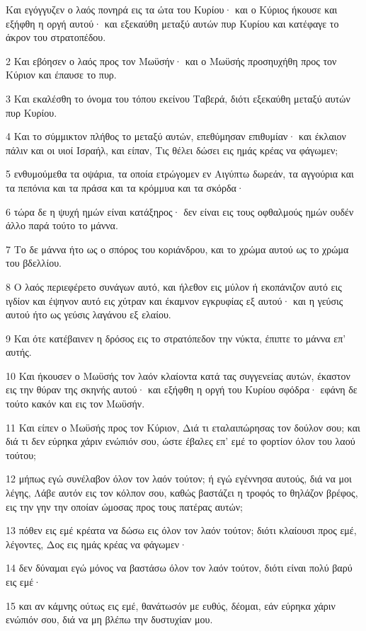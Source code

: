 \par Και εγόγγυζεν ο λαός πονηρά εις τα ώτα του Κυρίου· και ο Κύριος ήκουσε και εξήφθη η οργή αυτού· και εξεκαύθη μεταξύ αυτών πυρ Κυρίου και κατέφαγε το άκρον του στρατοπέδου.
\par 2 Και εβόησεν ο λαός προς τον Μωϋσήν· και ο Μωϋσής προσηυχήθη προς τον Κύριον και έπαυσε το πυρ.
\par 3 Και εκαλέσθη το όνομα του τόπου εκείνου Ταβερά, διότι εξεκαύθη μεταξύ αυτών πυρ Κυρίου.
\par 4 Και το σύμμικτον πλήθος το μεταξύ αυτών, επεθύμησαν επιθυμίαν· και έκλαιον πάλιν και οι υιοί Ισραήλ, και είπαν, Τις θέλει δώσει εις ημάς κρέας να φάγωμεν;
\par 5 ενθυμούμεθα τα οψάρια, τα οποία ετρώγομεν εν Αιγύπτω δωρεάν, τα αγγούρια και τα πεπόνια και τα πράσα και τα κρόμμυα και τα σκόρδα·
\par 6 τώρα δε η ψυχή ημών είναι κατάξηρος· δεν είναι εις τους οφθαλμούς ημών ουδέν άλλο παρά τούτο το μάννα.
\par 7 Το δε μάννα ήτο ως ο σπόρος του κοριάνδρου, και το χρώμα αυτού ως το χρώμα του βδελλίου.
\par 8 Ο λαός περιεφέρετο συνάγων αυτό, και ήλεθον εις μύλον ή εκοπάνιζον αυτό εις ιγδίον και έψηνον αυτό εις χύτραν και έκαμνον εγκρυφίας εξ αυτού· και η γεύσις αυτού ήτο ως γεύσις λαγάνου εξ ελαίου.
\par 9 Και ότε κατέβαινεν η δρόσος εις το στρατόπεδον την νύκτα, έπιπτε το μάννα επ' αυτής.
\par 10 Και ήκουσεν ο Μωϋσής τον λαόν κλαίοντα κατά τας συγγενείας αυτών, έκαστον εις την θύραν της σκηνής αυτού· και εξήφθη η οργή του Κυρίου σφόδρα· εφάνη δε τούτο κακόν και εις τον Μωϋσήν.
\par 11 Και είπεν ο Μωϋσής προς τον Κύριον, Διά τι εταλαιπώρησας τον δούλον σου; και διά τι δεν εύρηκα χάριν ενώπιόν σου, ώστε έβαλες επ' εμέ το φορτίον όλον του λαού τούτου;
\par 12 μήπως εγώ συνέλαβον όλον τον λαόν τούτον; ή εγώ εγέννησα αυτούς, διά να μοι λέγης, Λάβε αυτόν εις τον κόλπον σου, καθώς βαστάζει η τροφός το θηλάζον βρέφος, εις την γην την οποίαν ώμοσας προς τους πατέρας αυτών;
\par 13 πόθεν εις εμέ κρέατα να δώσω εις όλον τον λαόν τούτον; διότι κλαίουσι προς εμέ, λέγοντες, Δος εις ημάς κρέας να φάγωμεν·
\par 14 δεν δύναμαι εγώ μόνος να βαστάσω όλον τον λαόν τούτον, διότι είναι πολύ βαρύ εις εμέ·
\par 15 και αν κάμνης ούτως εις εμέ, θανάτωσόν με ευθύς, δέομαι, εάν εύρηκα χάριν ενώπιόν σου, διά να μη βλέπω την δυστυχίαν μου.
